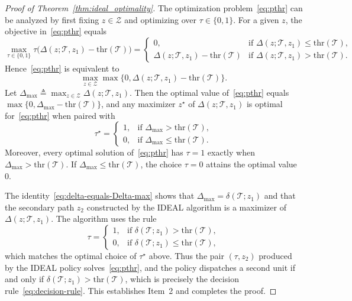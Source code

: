 \documentclass[10pt,a4paper]{amsart}
\newcommand{\Let}{\triangleq}
\newcommand{\opt}{^\star}
\begin{document}
\begin{proof}[Proof of Theorem~\ref{thm:ideal_optimality}]
The optimization problem~\eqref{eq:pthr} can be analyzed by first fixing $z\in\mathcal Z$ and optimizing over $\tau\in\{0,1\}$. For a given $z$, the objective in~\eqref{eq:pthr} equals
\[
\max_{\tau\in\{0,1\}} \tau\bigl(\Delta(z;\mathcal T,z_1) - \mathrm{thr}(\mathcal T)\bigr)
=
\begin{cases}
0, & \text{if } \Delta(z;\mathcal T,z_1) \le \mathrm{thr}(\mathcal T),\\[0.5ex]
\Delta(z;\mathcal T,z_1) - \mathrm{thr}(\mathcal T) & \text{if } \Delta(z;\mathcal T,z_1) > \mathrm{thr}(\mathcal T).
\end{cases}
\]
Hence~\eqref{eq:pthr} is equivalent to
\[
\max_{z\in\mathcal Z}
\max\bigl\{0, \Delta(z;\mathcal T,z_1) - \mathrm{thr}(\mathcal T)\bigr\}.
\]
Let $\Delta_{\max} \Let \max_{z\in\mathcal Z} \Delta(z;\mathcal T,z_1)$. Then the optimal value of~\eqref{eq:pthr} equals $\max\{0,\Delta_{\max} - \mathrm{thr}(\mathcal T)\}$, and any maximizer $z\opt$ of $\Delta(z;\mathcal T,z_1)$ is optimal for~\eqref{eq:pthr} when paired with
\[
\tau\opt =
\begin{cases}
1, & \text{if } \Delta_{\max} > \mathrm{thr}(\mathcal T),\\
0, & \text{if } \Delta_{\max} \le \mathrm{thr}(\mathcal T).
\end{cases}
\]
Moreover, every optimal solution of~\eqref{eq:pthr} has $\tau=1$ exactly when $\Delta_{\max} > \mathrm{thr}(\mathcal T)$. If $\Delta_{\max}\le \mathrm{thr}(\mathcal T)$, the choice $\tau=0$ attains the optimal value $0$.

The identity~\eqref{eq:delta-equals-Delta-max} shows that $\Delta_{\max} = \delta(\mathcal T; z_1)$ and that the secondary path $z_2$ constructed by the IDEAL algorithm is a maximizer of $\Delta(z;\mathcal T,z_1)$. The algorithm uses the rule
\[
\tau =
\begin{cases}
1, & \text{if } \delta(\mathcal T; z_1) > \mathrm{thr}(\mathcal T),\\
0, & \text{if } \delta(\mathcal T; z_1) \le \mathrm{thr}(\mathcal T),
\end{cases}
\]
which matches the optimal choice of $\tau\opt$ above. Thus the pair $(\tau,z_2)$ produced by the IDEAL policy solves~\eqref{eq:pthr}, and the policy dispatches a second unit if and only if $\delta(\mathcal T; z_1) > \mathrm{thr}(\mathcal T)$, 
which is precisely the decision rule~\eqref{eq:decision-rule}. This establishes Item~2 and completes the proof.
\end{proof}
\end{document}
